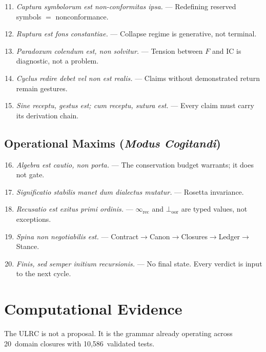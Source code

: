 \documentclass[
  aps,
  prd,
  twocolumn,
  superscriptaddress,
  nofootinbib,
  floatfix
]{revtex4-2}
\newcommand{\IR}{\infty_{\mathrm{rec}}}
\newcommand{\Fid}{F}
\newcommand{\IC}{\mathrm{IC}}
\newcommand{\lat}[1]{\textit{#1}}
\begin{document}
\begin{sloppypar}
\begin{enumerate}[nosep,leftmargin=*]\setcounter{enumi}{10}
\item \lat{Captura symbolorum est non-conformitas ipsa.} ---
  Redefining reserved symbols $=$ nonconformance.
\item \lat{Ruptura est fons constantiae.} ---
  Collapse regime is generative, not terminal.
\item \lat{Paradoxum colendum est, non solvitur.} ---
  Tension between $\Fid$ and $\IC$ is diagnostic, not a problem.
\item \lat{Cyclus redire debet vel non est realis.} ---
  Claims without demonstrated return remain gestures.
\item \lat{Sine receptu, gestus est;
  cum receptu, sutura est.} ---
  Every claim must carry its derivation chain.
\end{enumerate}

\subsection{Operational Maxims (\lat{Modus Cogitandi})}

\begin{enumerate}[nosep,leftmargin=*]\setcounter{enumi}{15}
\item \lat{Algebra est cautio, non porta.} ---
  The conservation budget warrants; it does not gate.
\item \lat{Significatio stabilis manet dum dialectus mutatur.}
  --- Rosetta invariance.
\item \lat{Recusatio est exitus primi ordinis.} ---
  $\IR$ and $\bot_{\mathrm{oor}}$ are typed values,
  not exceptions.
\item \lat{Spina non negotiabilis est.} ---
  Contract${\to}$Canon${\to}$Closures${\to}$Ledger${\to}$Stance.
\item \lat{Finis, sed semper initium recursionis.} ---
  No final state. Every verdict is input to the next cycle.
\end{enumerate}
\end{sloppypar}

\section{Computational Evidence}\label{sec:evidence}

The ULRC is not a proposal. It is the grammar already operating
across 20~domain closures with 10,586~validated tests.
\end{document}
